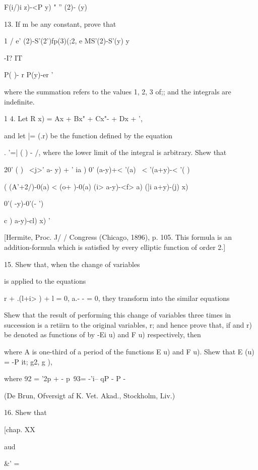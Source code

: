 {


F(i/)i z)-<P y) " '' (2)- (y)

13. If m be any constant, prove that

1 / e' (2)-S'(2')fp(3)(;2, e MS'(2)-S'(y) y

-I? IT

 P( )- r P(y)-er '

where the summation refers to the values 1, 2, 3 of;; and the
integrals are indefinite.


1 4. Let R x) = Ax + Bx" + Cx"- + Dx + ',

and let |= (.r) be the function defined by the equation

. '=| ( ) - /, where the lower limit of the integral is arbitrary.
Shew that

20' ( ) \ <j>' a- y) + ' ia ) 0' (a-y)+< '(a) \ < '(a+y)-< '( )

( (A'+2/)-0(a) < (o+ )-0(a) (i> a-y)-<f> a) (]i a+y)-(j) x)

0'( -y)-0'(- ')

c ) a-y)-cl) x) '

[Hermite, Proc. J/ / Congress (Chicago, 1896), p. 105. This formula is
an addition-formula which is satisfied by every elliptic function of
order 2.]

15. Shew that, when the change of variables

is applied to the equations

r + .(l+i> ) + l = 0, a.- - = 0, they transform into the similar
equations

Shew that the result of performing this change of variables three
times in succession is a retiirn to the original variables, r; and
hence prove that, if and r) be denoted as functions of by -Ei u) and F
u) respectively, then

where A is one-third of a period of the functions E u) and F u). Shew
that E (u) = -P it; g2, g ),

where 92 = '2p + - p\ 93= -'i-- qP - P -

(De Brun, Ofversigt af K. Vet. Akad., Stockholm, Liv.)

%
%

16. Shew that

[chap. XX

aud

\&' =

}
